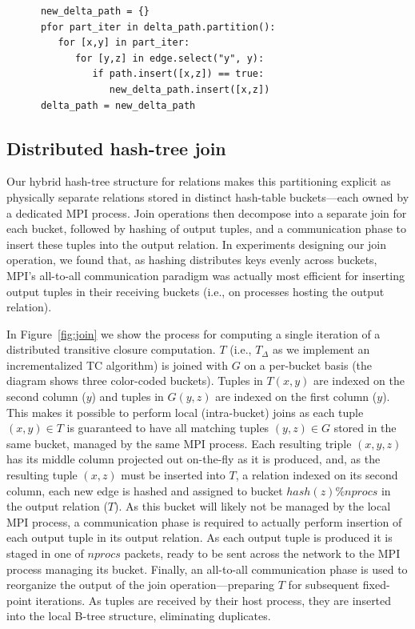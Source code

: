 \begin{verbatim}
      new_delta_path = {}
      pfor part_iter in delta_path.partition():
         for [x,y] in part_iter:
            for [y,z] in edge.select("y", y):
               if path.insert([x,z]) == true:
                  new_delta_path.insert([x,z])
      delta_path = new_delta_path   
\end{verbatim}


\subsection{Distributed hash-tree join}

Our hybrid hash-tree structure for relations makes this partitioning explicit as physically separate relations stored in distinct hash-table buckets---each owned by a dedicated MPI process. Join operations then decompose into a separate join for each bucket, followed by hashing of output tuples, and a communication phase to insert these tuples into the output relation. In experiments designing our join operation, we found that, as hashing distributes keys evenly across buckets, MPI's all-to-all communication paradigm was actually most efficient for inserting output tuples in their receiving buckets (i.e., on processes hosting the output relation).

In Figure~\ref{fig:join} we show the process for computing a single iteration of a distributed transitive closure computation. $T$ (i.e., $T_\Delta$ as we implement an incrementalized TC algorithm) is joined with $G$ on a per-bucket basis (the diagram shows three color-coded buckets). Tuples in $T(x,y)$ are indexed on the second column ($y$) and tuples in $G(y,z)$ are indexed on the first column ($y$). This makes it possible to perform local (intra-bucket) joins as each tuple $(x,y) \in T$ is guaranteed to have all matching tuples $(y,z) \in G$ stored in the same bucket, managed by the same MPI process. Each resulting triple $(x,y,z)$ has its middle column projected out on-the-fly as it is produced, and, as the resulting tuple $(x,z)$ must be inserted into $T$, a relation indexed on its second column, each new edge is hashed and assigned to bucket $\mathit{hash}(z)\%\mathit{nprocs}$ in the output relation ($T$). As this bucket will likely not be managed by the local MPI process, a communication phase is required to actually perform insertion of each output tuple in its output relation. As each output tuple is produced it is staged in one of $\mathit{nprocs}$ packets, ready to be sent across the network to the MPI process managing its bucket. Finally, an all-to-all communication phase is used to reorganize the output of the join operation---preparing $T$ for subsequent fixed-point iterations. As tuples are received by their host process, they are inserted into the local B-tree structure, eliminating duplicates.  


